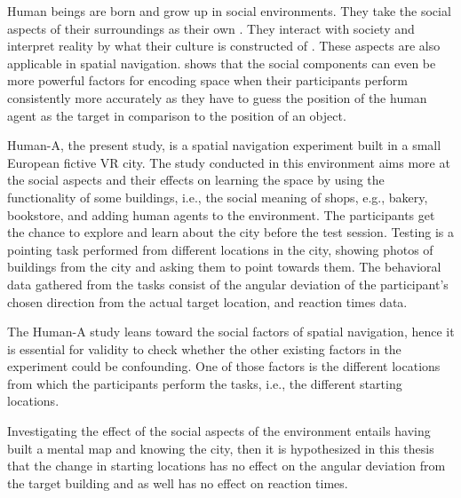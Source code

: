 Human beings are born and grow up in social environments. They take the social aspects of their surroundings as their own \autocite{berger1967luckman}. They interact with society and interpret reality by what their culture is constructed of \autocite{SIEGEL19759}. These aspects are also applicable in spatial navigation. \textcite{kuehn2018social} shows that the social components can even be more powerful factors for encoding space when their participants perform consistently more accurately as they have to guess the position of the human agent as the target in comparison to the position of an object.

Human-A, the present study, is a spatial navigation experiment built in a small European fictive VR city. The study conducted in this environment aims more at the social aspects and their effects on learning the space by using the functionality of some buildings, i.e., the social meaning of shops, e.g., bakery, bookstore, and adding human agents to the environment. The participants get the chance to explore and learn about the city before the test session. Testing is a pointing task performed from different locations in the city, showing photos of buildings from the city and asking them to point towards them. The behavioral data gathered from the tasks consist of the angular deviation of the participant's chosen direction from the actual target location, and reaction times data.

The Human-A study leans toward the social factors of spatial navigation, hence it is essential for validity to check whether the other existing factors in the experiment could be confounding. One of those factors is the different locations from which the participants perform the tasks, i.e., the different starting locations. 

Investigating the effect of the social aspects of the environment entails having built a mental map and knowing the city, then it is hypothesized in this thesis that the change in starting locations has no effect on the angular deviation from the target building and as well has no effect on reaction times.
